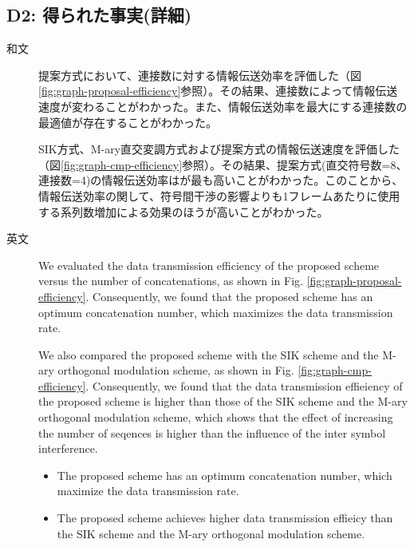 ﻿\documentclass[a4j,10pt]{jarticle}
\begin{document}
\subsection{D2: 得られた事実(詳細)} %
\begin{description}
 \item[和文] 提案方式において、連接数に対する情報伝送効率を評価した（図\ref{fig:graph-proposal-efficiency}参照）。その結果、連接数によって情報伝送速度が変わることがわかった。また、情報伝送効率を最大にする連接数の最適値が存在することがわかった。

SIK方式、M-ary直交変調方式および提案方式の情報伝送速度を評価した（図\ref{fig:graph-cmp-efficiency}参照）。その結果、提案方式(直交符号数=8、連接数=4)の情報伝送効率はが最も高いことがわかった。このことから、情報伝送効率の関して、符号間干渉の影響よりも1フレームあたりに使用する系列数増加による効果のほうが高いことがわかった。

%
 \item[英文] We evaluated the data transmission efficiency of the proposed scheme versus the number of concatenations, as shown in Fig. \ref{fig:graph-proposal-efficiency}. Consequently, we found that the proposed scheme has an optimum concatenation number, which maximizes the data transmission rate. 

We also compared the proposed scheme with the SIK scheme and the M-ary orthogonal modulation scheme, as shown in Fig. \ref{fig:graph-cmp-efficiency}. Consequently, we found that the data transmission effieiency of the proposed scheme is higher than those of the SIK scheme and the M-ary orthogonal modulation scheme, which shows that the effect of increasing the number of seqences is higher than the influence of the inter symbol interference.
 \begin{itemize}
 \item The proposed scheme has an optimum concatenation number, which maximize the data transmission rate. 
 \item The proposed scheme achieves higher data transmission effieicy than the SIK scheme and the M-ary orthogonal modulation scheme. 
 \end{itemize}
%
\end{description}
\end{document}
